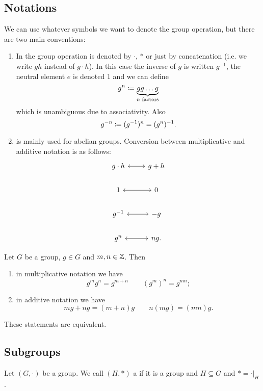 \subsection{Notations}
We can use whatever symbols we want to denote the group operation, but there are two main conventions:
\begin{enumerate}
\item In  the group operation is denoted by $\boldsymbol{\cdot}$, $*$ or just by concatenation (i.e. we write $gh$ instead of $g\cdot h$). In this case the inverse of $g$ is written $g^{-1}$, the neutral element $e$ is denoted $1$ and we can define
\[ g^n \coloneqq \underbrace{gg\ldots g}_{\text{$n$ factors}}\]
which is unambiguous due to associativity. Also
\[ g^{-n} \coloneqq (g^{-1})^n = (g^{n})^{-1}. \]
\item {} is mainly used for abelian groups. Conversion between multiplicative and additive notation is as follows:
\[ \begin{tikzcd}
g\cdot h \arrow[r, leftrightarrow]& g+h \\
1 \arrow[r, leftrightarrow]& 0 \\
g^{-1} \arrow[r, leftrightarrow]& -g \\
g^n \arrow[r, leftrightarrow] & ng.
\end{tikzcd} \]
\end{enumerate}

\begin{lemma} \label{calculusRepeatedGroupOperation}
Let $G$ be a group, $g\in G$ and $m,n\in \mathbb{Z}$. Then
\begin{enumerate}
\item in multiplicative notation we have
\[ g^mg^n = g^{m+n} \qquad (g^m)^n = g^{mn}; \]
\item in additive notation we have
\[ mg+ng = (m+n)g \qquad n(mg) = (mn)g. \]
\end{enumerate}
These statements are equivalent.
\end{lemma}

\subsection{Subgroups}
\begin{definition}
Let $(G,\boldsymbol{\cdot})$ be a group. We call $(H,*)$ a  if it is a group and $H\subseteq G$ and $* = \boldsymbol{\cdot}|_H$.
\end{definition}

